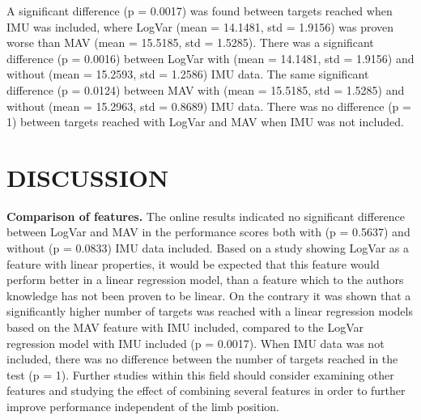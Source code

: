 \begin{multicols}{2}
	
		\begin{center}
		\end{center}
	
	A significant difference (p = 0.0017) was found between targets reached when IMU was included, where LogVar (mean = 14.1481, std = 1.9156) was proven worse than MAV (mean = 15.5185, std = 1.5285). There was a significant difference (p = 0.0016) between LogVar with (mean = 14.1481, std = 1.9156) and without (mean = 15.2593, std = 1.2586) IMU data. The same significant difference (p = 0.0124) between MAV with (mean = 15.5185, std = 1.5285) and without (mean = 15.2963, std = 0.8689) IMU data. There was no difference (p = 1) between targets reached with LogVar and MAV when IMU was not included.
	
\section*{DISCUSSION}%
	
%		
\textbf{Comparison of features.} The online results indicated no significant difference between LogVar and MAV in the performance scores both with (p = 0.5637) and without (p = 0.0833) IMU data included. Based on a study \cite{hahne2014} showing LogVar as a feature with linear properties, it would be expected that this feature would perform better in a linear regression model, than a feature which to the authors knowledge has not been proven to be linear. On the contrary it was shown that a significantly higher number of targets was reached with a linear regression models based on the MAV feature with IMU included, compared to the LogVar regression model with IMU included (p = 0.0017). When IMU data was not included, there was no difference between the number of targets reached in the test (p = 1).
Further studies within this field should consider examining other features and studying the effect of combining several features in order to further improve performance independent of the limb position.


\end{multicols}
